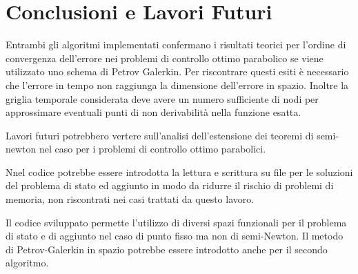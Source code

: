 \section{Conclusioni e Lavori Futuri}
\label{chap:Conclusion}
Entrambi gli algoritmi implementati confermano i risultati teorici per l'ordine di convergenza dell'errore nei problemi di controllo ottimo parabolico se viene utilizzato uno schema di Petrov Galerkin. Per riscontrare questi esiti è necessario che l'errore in tempo non raggiunga la dimensione dell'errore in spazio. Inoltre la griglia temporale considerata deve avere un numero sufficiente di nodi per approssimare eventuali punti di non derivabilità nella funzione esatta.
\par
Lavori futuri potrebbero vertere sull'analisi dell'estensione dei teoremi di semi-newton nel caso per i problemi di controllo ottimo parabolici. 
\par
Nnel codice potrebbe essere introdotta la lettura e scrittura su file per le soluzioni del problema di stato ed aggiunto in modo da ridurre il rischio di problemi di memoria, non riscontrati nei casi trattati da questo lavoro. 
\par
Il codice sviluppato permette l'utilizzo di diversi spazi funzionali per il problema di stato e di aggiunto nel caso di punto fisso ma non di semi-Newton. Il metodo di Petrov-Galerkin in spazio potrebbe essere introdotto anche per il secondo algoritmo.